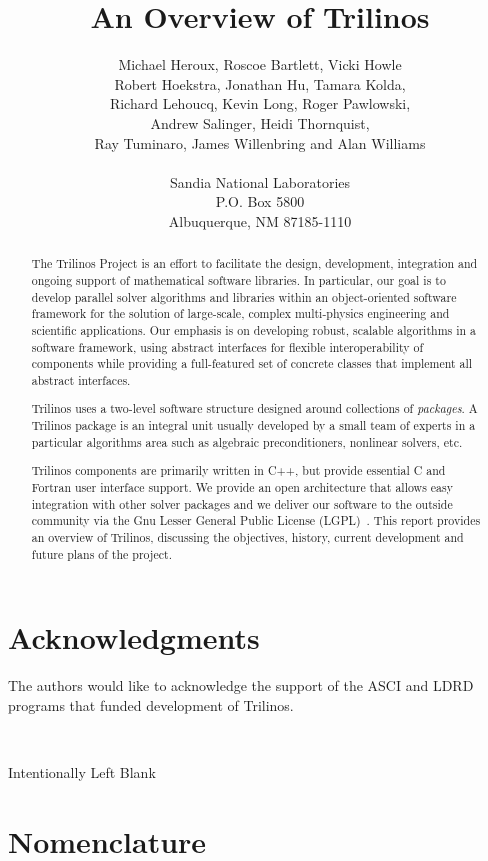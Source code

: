 \documentclass[12pt,relax]{TrilinosOverview}
\title{An Overview of Trilinos}
\author{Michael Heroux, Roscoe Bartlett, Vicki Howle \\
Robert Hoekstra, Jonathan Hu, Tamara Kolda, \\
Richard Lehoucq, Kevin Long, Roger Pawlowski, \\
Andrew Salinger, Heidi Thornquist, \\
Ray Tuminaro, James Willenbring and Alan Williams \\
 \\
Sandia National Laboratories \\
P.O. Box 5800 \\
Albuquerque, NM 87185-1110
}
\date{}
\begin{document}
\maketitle

\begin{abstract}
The Trilinos Project is an effort to facilitate the design,
development, integration and ongoing support of mathematical software
libraries.  In particular, our goal is to develop parallel solver 
algorithms and libraries within 
an object-oriented software framework for the solution of large-scale, complex
multi-physics engineering and scientific applications.   Our emphasis is on 
developing robust, scalable algorithms in a software framework, using abstract 
interfaces for flexible interoperability of components while providing a 
full-featured set of concrete classes that implement all abstract
interfaces.  

Trilinos uses a two-level software structure designed around
collections of
{\it packages}.  A Trilinos package is an integral unit usually
developed by a small team of experts in a particular algorithms area
such as algebraic preconditioners, nonlinear solvers, etc.

Trilinos components are primarily written in C++, but provide essential C and 
Fortran user interface support.  We provide an open architecture that allows 
easy integration with other solver packages and we deliver our software to 
the outside community via the Gnu Lesser General Public License
(LGPL)~\cite{gnu-license-site}.
This report provides an overview of Trilinos, discussing the 
objectives, history, current development and future plans of the project.
\end{abstract}


\clearpage
\section*{Acknowledgments}
The authors would like to acknowledge the support of the ASCI and LDRD programs
that funded development of Trilinos.

\newpage
\
\vspace{3.5in}
\begin{center}Intentionally Left Blank\end{center}
\clearpage
\tableofcontents
\listoffigures

\clearpage
{}
\section*{Nomenclature}

\end{document}
